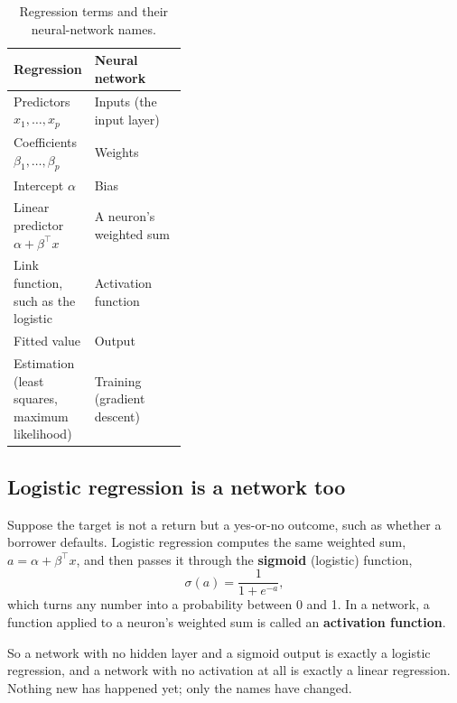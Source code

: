 \begin{table}[htbp]
\centering
\small
\caption{Regression terms and their neural-network names.}
\label{tab:20-nnterms}
\begin{tabularx}{0.85\linewidth}{@{}>{\raggedright\arraybackslash}p{0.38\linewidth}>{\raggedright\arraybackslash}X@{}}
\toprule
Regression & Neural network \\
\midrule
Predictors $x_1, \dots, x_p$ & Inputs (the input layer) \\
Coefficients $\beta_1, \dots, \beta_p$ & Weights \\
Intercept $\alpha$ & Bias \\
Linear predictor $\alpha + \beta^{\top}x$ & A neuron's weighted sum \\
Link function, such as the logistic & Activation function \\
Fitted value & Output \\
Estimation (least squares, maximum likelihood) & Training (gradient descent) \\
\bottomrule
\end{tabularx}
\end{table}

\subsection{Logistic regression is a network too}

Suppose the target is not a return but a yes-or-no outcome, such as whether a borrower defaults. Logistic regression computes the same weighted sum, $a = \alpha + \beta^{\top}x$, and then passes it through the \textbf{sigmoid} (logistic) function,
\begin{equation}
  \sigma(a) = \frac{1}{1 + e^{-a}},
  \label{eq:20-sigmoid}
\end{equation}
which turns any number into a probability between 0 and 1. In a network, a function applied to a neuron's weighted sum is called an \textbf{activation function}.

So a network with no hidden layer and a sigmoid output is exactly a logistic regression, and a network with no activation at all is exactly a linear regression. Nothing new has happened yet; only the names have changed.

